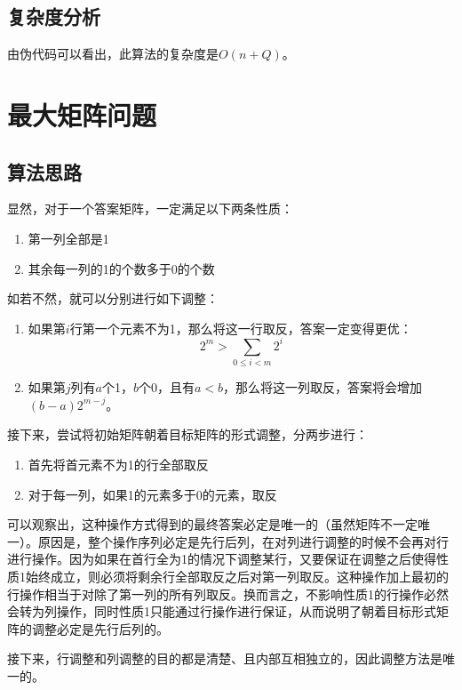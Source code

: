 \documentclass[UTF8]{ctexart}
\begin{document}
    \subsection*{复杂度分析}
        由伪代码可以看出，此算法的复杂度是$O(n+Q)$。

\section{最大矩阵问题} %
    \subsection*{算法思路}
        显然，对于一个答案矩阵，一定满足以下两条性质：
        \begin{enumerate}
            \item 第一列全部是1
            \item 其余每一列的1的个数多于0的个数
        \end{enumerate}

        如若不然，就可以分别进行如下调整：
        \begin{enumerate}
            \item 如果第$i$行第一个元素不为1，那么将这一行取反，答案一定变得更优：
            $$2^m>\sum_{0\leq i < m}{2^i}$$
            \item 如果第$j$列有$a$个1，$b$个0，且有$a < b$，那么将这一列取反，答案将会增加$(b-a)2^{m-j}$。
        \end{enumerate}

        接下来，尝试将初始矩阵朝着目标矩阵的形式调整，分两步进行：
        \begin{enumerate}
            \item 首先将首元素不为1的行全部取反
            \item 对于每一列，如果1的元素多于0的元素，取反
        \end{enumerate}

        可以观察出，这种操作方式得到的最终答案必定是唯一的（虽然矩阵不一定唯一）。原因是，整个操作序列必定是先行后列，在对列进行调整的时候不会再对行进行操作。因为如果在首行全为1的情况下调整某行，又要保证在调整之后使得性质1始终成立，则必须将剩余行全部取反之后对第一列取反。这种操作加上最初的行操作相当于对除了第一列的所有列取反。换而言之，不影响性质1的行操作必然会转为列操作，同时性质1只能通过行操作进行保证，从而说明了朝着目标形式矩阵的调整必定是先行后列的。

        接下来，行调整和列调整的目的都是清楚、且内部互相独立的，因此调整方法是唯一的。
\end{document}
